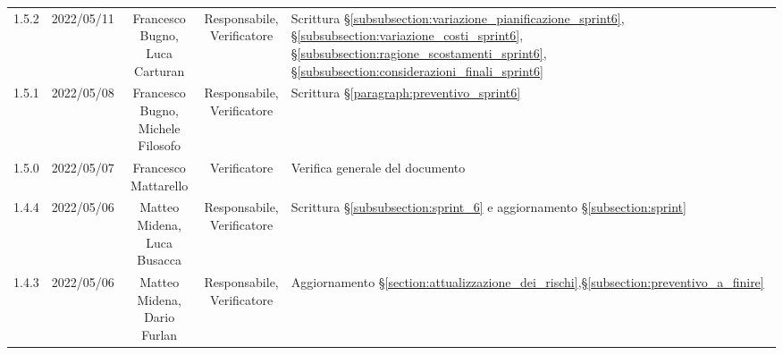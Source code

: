\begin{center}
\begin{longtable}[c]{c | c | c | c | p{5cm}}
		1.5.2                                                      & 2022/05/11 & \Shortunderstack{Francesco Bugno,                                                                                                                                                                   \\Luca Carturan} & \Shortunderstack{Responsabile,\\Verificatore} & Scrittura §\ref{subsubsection:variazione_pianificazione_sprint6}, §\ref{subsubsection:variazione_costi_sprint6}, §\ref{subsubsection:ragione_scostamenti_sprint6}, §\ref{subsubsection:considerazioni_finali_sprint6}\\
		1.5.1                                                      & 2022/05/08 & \Shortunderstack{Francesco Bugno,                                                                                                                                                                   \\Michele Filosofo} & \Shortunderstack{Responsabile,\\Verificatore} & Scrittura §\ref{paragraph:preventivo_sprint6}\\
		1.5.0                                                      & 2022/05/07 & Francesco Mattarello                   & Verificatore   & Verifica generale del documento                                                                                                           \\
		1.4.4                                                      & 2022/05/06 & \Shortunderstack{Matteo Midena,                                                                                                                                                                     \\Luca Busacca} & \Shortunderstack{Responsabile,\\Verificatore} & Scrittura §\ref{subsubsection:sprint_6} e aggiornamento §\ref{subsection:sprint}\\
		1.4.3                                                      & 2022/05/06 & \Shortunderstack{Matteo Midena,                                                                                                                                                                     \\Dario Furlan} & \Shortunderstack{Responsabile,\\Verificatore} & Aggiornamento §\ref{section:attualizzazione_dei_rischi},§\ref{subsection:preventivo_a_finire}\\

\end{longtable}
\end{center}
